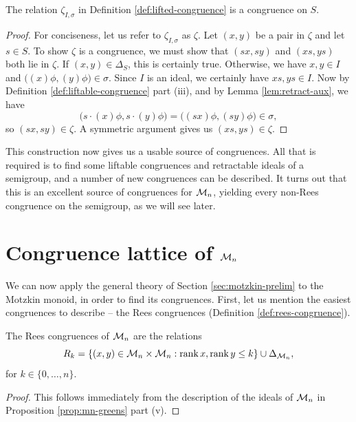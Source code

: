 \begin{theorem}
  \label{thm:lifted-congruence}
  The relation $\zeta_{I,\sigma}$ in Definition \ref{def:lifted-congruence} is a
  congruence on $S$.
  \begin{proof}
    For conciseness, let us refer to $\zeta_{I,\sigma}$ as $\zeta$.  Let $(x,y)$
    be a pair in $\zeta$ and let $s \in S$.  To show $\zeta$ is a congruence, we
    must show that $(sx,sy)$ and $(xs,ys)$ both lie in $\zeta$.  If
    $(x,y) \in \Delta_S$, this is certainly true.  Otherwise, we have
    $x, y \in I$ and $\big((x)\phi, (y)\phi\big) \in \sigma$.  Since $I$ is an
    ideal, we certainly have $xs,ys\in I$.  Now by Definition
    \ref{def:liftable-congruence} part (iii), and by Lemma
    \ref{lem:retract-aux}, we have
    $$\big(s \cdot (x)\phi, s \cdot (y)\phi\big)
    = \big((sx)\phi, (sy)\phi\big) \in \sigma,$$
    so $(sx, sy) \in \zeta$.  A symmetric argument gives us $(xs,ys) \in \zeta$.
  \end{proof}
\end{theorem}

This construction now gives us a usable source of congruences.  All that is
required is to find some liftable congruences and retractable ideals of a
semigroup, and a number of new congruences can be described.  It turns out that
this is an excellent source of congruences for $\mathcal{M}_n$, yielding every non-Rees
congruence on the semigroup, as we will see later.

\section{Congruence lattice of $\mathcal{M}_n$}
\label{sec:motzkin-congs}


We can now apply the general theory of Section \ref{sec:motzkin-prelim} to the
Motzkin monoid, in order to find its congruences.  First, let us mention the
easiest congruences to describe -- the Rees congruences (Definition
\ref{def:rees-congruence}).

\begin{proposition}
  \label{prop:motzkin-rees}
  The Rees congruences of $\mathcal{M}_n$ are the relations
  $$R_k = \{(x,y) \in \mathcal{M}_n \times \mathcal{M}_n : \operatorname{rank} x, \operatorname{rank} y \leq k\} \cup
  \Delta_{\mathcal{M}_n},$$
  for $k \in \{0, \ldots, n\}$.
  \begin{proof}
    This follows immediately from the description of the ideals of $\mathcal{M}_n$ in
    Proposition \ref{prop:mn-greens} part (v).
  \end{proof}
\end{proposition}

